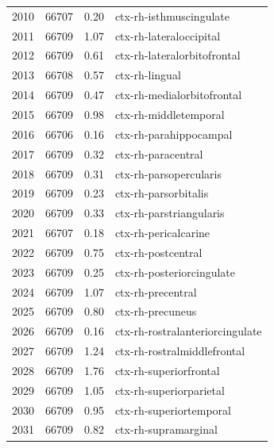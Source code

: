 \documentclass[pdflatex,sn-nature]{sn-jnl}%
\theoremstyle{thmstyleone}%
\theoremstyle{thmstyletwo}%
\theoremstyle{thmstylethree}%
\begin{document}
\begin{appendices}
\begin{small}
\begin{longtable}{r|r|r|l}
   2010 &     66707 &                0.20 &         ctx-rh-isthmuscingulate \\
   2011 &     66709 &                1.07 &         ctx-rh-lateraloccipital \\
   2012 &     66709 &                0.61 &     ctx-rh-lateralorbitofrontal \\
   2013 &     66708 &                0.57 &                  ctx-rh-lingual \\
   2014 &     66709 &                0.47 &      ctx-rh-medialorbitofrontal \\
   2015 &     66709 &                0.98 &           ctx-rh-middletemporal \\
   2016 &     66706 &                0.16 &          ctx-rh-parahippocampal \\
   2017 &     66709 &                0.32 &              ctx-rh-paracentral \\
   2018 &     66709 &                0.31 &          ctx-rh-parsopercularis \\
   2019 &     66709 &                0.23 &            ctx-rh-parsorbitalis \\
   2020 &     66709 &                0.33 &         ctx-rh-parstriangularis \\
   2021 &     66707 &                0.18 &            ctx-rh-pericalcarine \\
   2022 &     66709 &                0.75 &              ctx-rh-postcentral \\
   2023 &     66709 &                0.25 &       ctx-rh-posteriorcingulate \\
   2024 &     66709 &                1.07 &               ctx-rh-precentral \\
   2025 &     66709 &                0.80 &                ctx-rh-precuneus \\
   2026 &     66709 &                0.16 & ctx-rh-rostralanteriorcingulate \\
   2027 &     66709 &                1.24 &     ctx-rh-rostralmiddlefrontal \\
   2028 &     66709 &                1.76 &          ctx-rh-superiorfrontal \\
   2029 &     66709 &                1.05 &         ctx-rh-superiorparietal \\
   2030 &     66709 &                0.95 &         ctx-rh-superiortemporal \\
   2031 &     66709 &                0.82 &            ctx-rh-supramarginal \\

\end{longtable}
\end{small}
\end{appendices}
\end{document}
